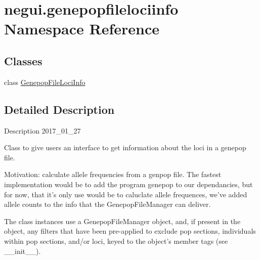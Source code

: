 \hypertarget{namespacenegui_1_1genepopfilelociinfo}{}\section{negui.\+genepopfilelociinfo Namespace Reference}
\label{namespacenegui_1_1genepopfilelociinfo}
\subsection*{Classes}
\begin{DoxyCompactItemize}
\item 
class \hyperlink{classnegui_1_1genepopfilelociinfo_1_1GenepopFileLociInfo}{Genepop\+File\+Loci\+Info}
\end{DoxyCompactItemize}


\subsection{Detailed Description}
\begin{DoxyVerb}Description
2017_01_27

Class to give users an interface to get information about the loci
in a genepop file.

Motivation: calculate allele frequencies from a genpop file.  The
fastest implementation would be to add the program genepop to our
dependancies, but for now, that it's only use would be to caluclate
allele frequences, we've added allele counts to the info that the
GenepopFileManager can deliver. 

The class instances use a GenepopFileManager object, and, if
present in the object, any filters that have been pre-applied to
exclude pop sections, individuals within pop sections, and/or
loci, keyed to the object's member tags (see __init__).\end{DoxyVerb}
 